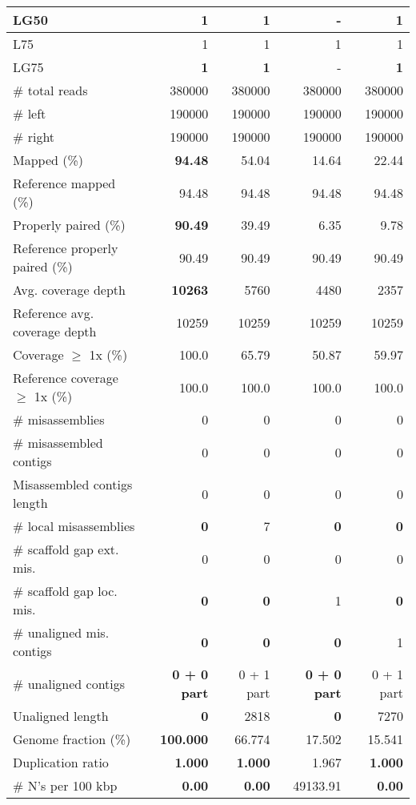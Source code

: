 \documentclass[12pt,a4paper]{article}
\begin{document}
\begin{table}[ht]
\begin{center}
\begin{tabular}{|l*{4}{|r}|}
LG50 & {\bf 1} & {\bf 1} & - & {\bf 1} \\ \hline
L75 & 1 & 1 & 1 & 1 \\ \hline
LG75 & {\bf 1} & {\bf 1} & - & {\bf 1} \\ \hline
\# total reads & 380000 & 380000 & 380000 & 380000 \\ \hline
\# left & 190000 & 190000 & 190000 & 190000 \\ \hline
\# right & 190000 & 190000 & 190000 & 190000 \\ \hline
Mapped (\%) & {\bf 94.48} & 54.04 & 14.64 & 22.44 \\ \hline
Reference mapped (\%) & 94.48 & 94.48 & 94.48 & 94.48 \\ \hline
Properly paired (\%) & {\bf 90.49} & 39.49 & 6.35 & 9.78 \\ \hline
Reference properly paired (\%) & 90.49 & 90.49 & 90.49 & 90.49 \\ \hline
Avg. coverage depth & {\bf 10263} & 5760 & 4480 & 2357 \\ \hline
Reference avg. coverage depth & 10259 & 10259 & 10259 & 10259 \\ \hline
Coverage $\geq$ 1x (\%) & 100.0 & 65.79 & 50.87 & 59.97 \\ \hline
Reference coverage $\geq$ 1x (\%) & 100.0 & 100.0 & 100.0 & 100.0 \\ \hline
\# misassemblies & 0 & 0 & 0 & 0 \\ \hline
\# misassembled contigs & 0 & 0 & 0 & 0 \\ \hline
Misassembled contigs length & 0 & 0 & 0 & 0 \\ \hline
\# local misassemblies & {\bf 0} & 7 & {\bf 0} & {\bf 0} \\ \hline
\# scaffold gap ext. mis. & 0 & 0 & 0 & 0 \\ \hline
\# scaffold gap loc. mis. & {\bf 0} & {\bf 0} & 1 & {\bf 0} \\ \hline
\# unaligned mis. contigs & {\bf 0} & {\bf 0} & {\bf 0} & 1 \\ \hline
\# unaligned contigs & {\bf 0 + 0 part} & 0 + 1 part & {\bf 0 + 0 part} & 0 + 1 part \\ \hline
Unaligned length & {\bf 0} & 2818 & {\bf 0} & 7270 \\ \hline
Genome fraction (\%) & {\bf 100.000} & 66.774 & 17.502 & 15.541 \\ \hline
Duplication ratio & {\bf 1.000} & {\bf 1.000} & 1.967 & {\bf 1.000} \\ \hline
\# N's per 100 kbp & {\bf 0.00} & {\bf 0.00} & 49133.91 & {\bf 0.00} \\ \hline

\end{tabular}
\end{center}
\end{table}
\end{document}
